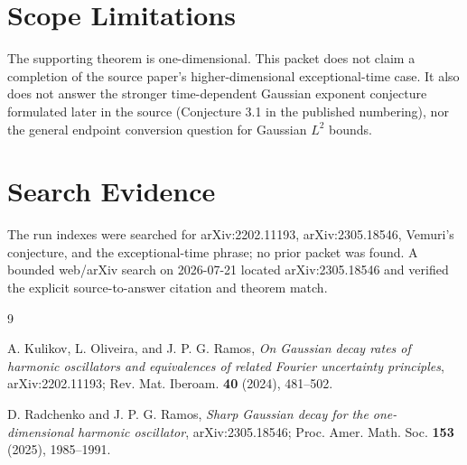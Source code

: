 \documentclass[11pt]{article}
\begin{document}
\section*{Scope Limitations}

The supporting theorem is one-dimensional.  This packet does not claim a
completion of the source paper's higher-dimensional exceptional-time case.
It also does not answer the stronger time-dependent Gaussian exponent
conjecture formulated later in the source (Conjecture 3.1 in the published
numbering), nor the general endpoint conversion question for Gaussian
\(L^2\) bounds.

\section*{Search Evidence}

The run indexes were searched for arXiv:2202.11193, arXiv:2305.18546,
Vemuri's conjecture, and the exceptional-time phrase; no prior packet was
found.  A bounded web/arXiv search on 2026-07-21 located arXiv:2305.18546 and
verified the explicit source-to-answer citation and theorem match.

\begin{thebibliography}{9}

A. Kulikov, L. Oliveira, and J. P. G. Ramos,
\emph{On Gaussian decay rates of harmonic oscillators and equivalences of
related Fourier uncertainty principles}, arXiv:2202.11193; Rev. Mat.
Iberoam. \textbf{40} (2024), 481--502.

D. Radchenko and J. P. G. Ramos,
\emph{Sharp Gaussian decay for the one-dimensional harmonic oscillator},
arXiv:2305.18546; Proc. Amer. Math. Soc. \textbf{153} (2025), 1985--1991.

\end{thebibliography}
\end{document}
